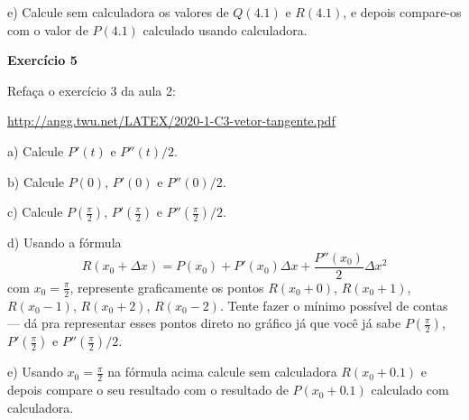 \documentclass[oneside,12pt]{article}
\begin{document}
e) Calcule sem calculadora os valores de $Q(4.1)$ e $R(4.1)$, e depois
compare-os com o valor de $P(4.1)$ calculado usando calculadora.

\bsk
\bsk

{\bf Exercício 5}

\ssk

Refaça o exercício 3 da aula 2:

\ssk

\url{http://angg.twu.net/LATEX/2020-1-C3-vetor-tangente.pdf}

\ssk
a) Calcule $P'(t)$ e $P''(t)/2$.

b) Calcule $P(0)$, $P'(0)$ e $P''(0)/2$.

c) Calcule $P(\frac{\pi}{2})$, $P'(\frac{\pi}{2})$ e $P''(\frac{\pi}{2})/2$.

\newpage



d) Usando a fórmula
%
$$R(x_0+Δx) = P(x_0) + P'(x_0)Δx + \frac{P''(x_0)}{2}Δx^2
$$
%
com $x_0=\frac{π}{2}$, represente graficamente os pontos $R(x_0+0)$,
$R(x_0+1)$, $R(x_0-1)$, $R(x_0+2)$, $R(x_0-2)$. Tente fazer o mínimo
possível de contas --- dá pra representar esses pontos direto no
gráfico já que você já sabe $P(\frac{\pi}{2})$, $P'(\frac{\pi}{2})$ e
$P''(\frac{\pi}{2})/2$.

\ssk

e) Usando $x_0=\frac{π}{2}$ na fórmula acima calcule sem calculadora
$R(x_0+0.1)$ e depois compare o seu resultado com o resultado de
$P(x_0+0.1)$ calculado com calculadora.








\end{document}
